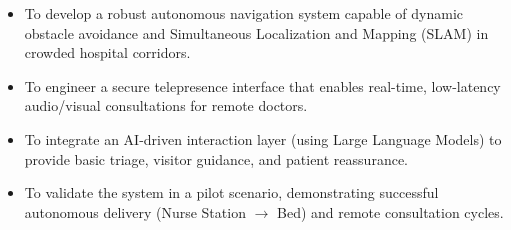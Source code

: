 
\begin{itemize}[leftmargin=*]
    \item To develop a robust autonomous navigation system capable of dynamic obstacle avoidance and Simultaneous Localization and Mapping (SLAM) in crowded hospital corridors.

    \item To engineer a secure telepresence interface that enables real-time, low-latency audio/visual consultations for remote doctors.

    \item To integrate an AI-driven interaction layer (using Large Language Models) to provide basic triage, visitor guidance, and patient reassurance.

    \item To validate the system in a pilot scenario, demonstrating successful autonomous delivery (Nurse Station $\rightarrow$ Bed) and remote consultation cycles.
\end{itemize}
